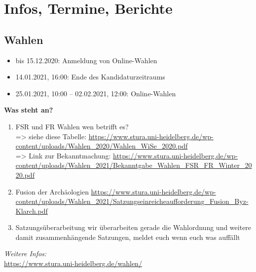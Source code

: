 \section{Infos, Termine, Berichte}
\subsection{Wahlen}
\begin{itemize}
    \item bis 15.12.2020: Anmeldung von Online-Wahlen
    \item 14.01.2021, 16:00: Ende des Kandidaturzeitraums
    \item 25.01.2021, 10:00 – 02.02.2021, 12:00: Online-Wahlen
\end{itemize}
\textbf{Was steht an?}
\begin{enumerate}
    \item FSR und FR Wahlen wen betrifft es?\\
    => siehe diese Tabelle: \url{https://www.stura.uni-heidelberg.de/wp-content/uploads/Wahlen_2020/Wahlen_WiSe_2020.pdf}\\
    => Link zur Bekanntmachung: \url{https://www.stura.uni-heidelberg.de/wp-content/uploads/Wahlen_2021/Bekanntgabe_Wahlen_FSR_FR_Winter_2020.pdf}
    \item Fusion der Archäologien \url{https://www.stura.uni-heidelberg.de/wp-content/uploads/Wahlen_2021/Satzungseinreicheaufforderung_Fusion_Byz-Klarch.pdf}
    \item  Satzungsüberarbeitung wir überarbeiten gerade die Wahlordnung und weitere damit zusammenhängende Satzungen, meldet euch wenn euch was auffällt
\end{enumerate}
\emph{Weitere Infos:}\\
\url{https://www.stura.uni-heidelberg.de/wahlen/}